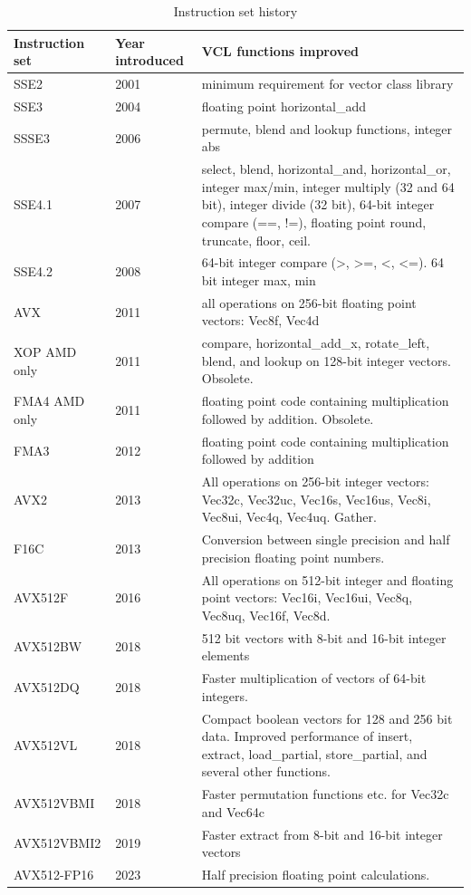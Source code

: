 \documentclass[vcl_manual.tex]{subfiles}
\begin{document}
\begin {table}[h]
\caption{Instruction set history}
\label{table:instructionSetHistory}
\begin{tabular}{|p{24mm}|p{22mm}|p{100mm}|}
\hline
\bfseries Instruction \newline set & \bfseries Year \newline introduced & \bfseries VCL functions improved \\ \hline
SSE2 & 2001 & minimum requirement for vector class library \\ \hline
SSE3 & 2004 & floating point horizontal\_add \\ \hline
SSSE3 & 2006 & permute, blend and lookup functions, integer abs \\ \hline
SSE4.1 & 2007 & select, blend, horizontal\_and, horizontal\_or, integer max/min, integer multiply (32 and 64 bit), integer divide (32 bit), 64-bit integer compare (==, !=), floating point round, truncate, floor, ceil. \\ \hline
SSE4.2 & 2008 & 64-bit integer compare (\textgreater, \textgreater =, \textless, \textless =). 64 bit integer max, min \\ \hline
AVX & 2011 & all operations on 256-bit floating point vectors: Vec8f, Vec4d \\ \hline
XOP \newline AMD only & 2011 & compare, horizontal\_add\_x, rotate\_left, blend, and lookup on 128-bit integer vectors. Obsolete. \\ \hline
FMA4 \newline AMD only & 2011 & floating point code containing multiplication followed by addition. Obsolete. \\ \hline
FMA3 & 2012 & floating point code containing multiplication followed by addition \\ \hline
AVX2 & 2013 & All operations on 256-bit integer vectors: Vec32c, Vec32uc, Vec16s, Vec16us, Vec8i, Vec8ui, Vec4q, Vec4uq. Gather. \\ \hline
F16C & 2013 & Conversion between single precision and half precision floating point numbers. \\ \hline
AVX512F & 2016 & All operations on 512-bit integer and floating point vectors: Vec16i, Vec16ui, Vec8q, Vec8uq, Vec16f, Vec8d. \\ \hline
AVX512BW & 2018 & 512 bit vectors with 8-bit and 16-bit integer elements \\ \hline
AVX512DQ & 2018 & Faster multiplication of vectors of 64-bit integers. \\ \hline
AVX512VL & 2018 & Compact boolean vectors for 128 and 256 bit data. 
Improved performance of insert, extract, load\_partial, store\_partial, and several other functions. \\ \hline
AVX512VBMI & 2018 & Faster permutation functions etc. for Vec32c and Vec64c \\ \hline
AVX512VBMI2 & 2019 & Faster extract from 8-bit and 16-bit integer vectors \\ \hline
AVX512-FP16 & 2023 & Half precision floating point calculations. \\ \hline
\end{tabular}
\end{table}
\end{document}
